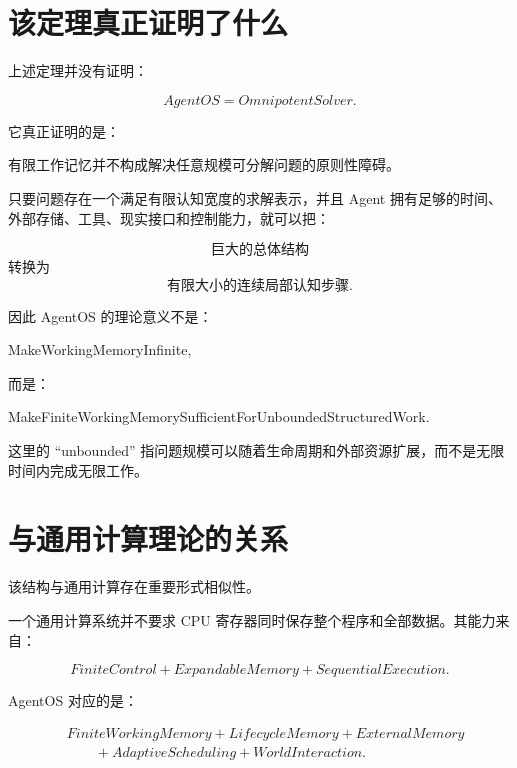 \section{该定理真正证明了什么}

上述定理并没有证明：

\begin{equation}
\boxed{
AgentOS
=
OmnipotentSolver.
}
\end{equation}

它真正证明的是：

\begin{statementbox}
有限工作记忆并不构成解决任意规模可分解问题的原则性障碍。
\end{statementbox}

只要问题存在一个满足有限认知宽度的求解表示，并且 Agent 拥有足够的时间、外部存储、工具、现实接口和控制能力，就可以把：

\begin{equation}
\text{巨大的总体结构}
\end{equation}
转换为
\begin{equation}
\text{有限大小的连续局部认知步骤}.
\end{equation}

因此 AgentOS 的理论意义不是：

\begin{statementbox}
MakeWorkingMemoryInfinite,
\end{statementbox}
而是：

\begin{statementbox}
MakeFiniteWorkingMemorySufficientForUnboundedStructuredWork.
\end{statementbox}

这里的 ``unbounded'' 指问题规模可以随着生命周期和外部资源扩展，而不是无限时间内完成无限工作。

\section{与通用计算理论的关系}

该结构与通用计算存在重要形式相似性。

一个通用计算系统并不要求 CPU 寄存器同时保存整个程序和全部数据。其能力来自：

\begin{equation}
FiniteControl
+
ExpandableMemory
+
SequentialExecution.
\end{equation}

AgentOS 对应的是：

\begin{equation}
\begin{aligned}
&FiniteWorkingMemory + LifecycleMemory + ExternalMemory \\
&\qquad + AdaptiveScheduling + WorldInteraction.
\end{aligned}
\end{equation}


